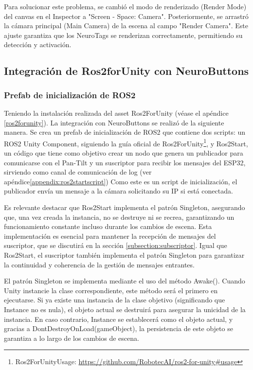 Para solucionar este problema, se cambió el modo de renderizado (Render Mode) del canvas en el Inspector a "Screen - Space: Camera". Posteriormente, se arrastró la cámara principal (Main Camera) de la escena al campo "Render Camera". Este ajuste garantiza que los NeuroTags se renderizan correctamente, permitiendo su detección y activación.

\subsection{Integración de Ros2forUnity con NeuroButtons}

\subsubsection{Prefab de inicialización de ROS2}
Teniendo la instalación realizada del asset Ros2ForUnity (véase el apéndice \ref{ros2forunity}). La integración con NeuroButtons se realizó de la siguiente manera. Se crea un prefab de inicialización de ROS2 que contiene dos scripts: un ROS2 Unity Component, siguiendo la guía oficial de Ros2ForUnity\footnote{Ros2ForUnityUsage: \url{https://github.com/RobotecAI/ros2-for-unity\#usage}}, y Ros2Start, un código que tiene como objetivo crear un nodo que genera un publicador para comunicarse con el Pan-Tilt y un suscriptor para recibir los mensajes del ESP32, sirviendo como canal de comunicación de log (ver ap\'endice\ref{appendix:ros2startscript}) Como este es un script de inicialización, el publicador envía un mensaje a la cámara solicitando su IP si está conectada.



Es relevante destacar que Ros2Start implementa el patrón Singleton, asegurando que, una vez creada la instancia, no se destruye ni se recrea, garantizando un funcionamiento constante incluso durante los cambios de escena. Esta implementación es esencial para mantener la recepción de mensajes del suscriptor, que se discutirá en la sección \ref{subsection:subscriptor}. Igual que Ros2Start, el suscriptor también implementa el patrón Singleton para garantizar la continuidad y coherencia de la gestión de mensajes entrantes.



El patrón Singleton se implementa mediante el uso del método Awake(). Cuando Unity instancie la clase correspondiente, este método será el primero en ejecutarse. Si ya existe una instancia de la clase objetivo (significando que Instance no es nula), el objeto actual se destruirá para asegurar la unicidad de la instancia. En caso contrario, Instance se establecerá como el objeto actual, y gracias a DontDestroyOnLoad(gameObject), la persistencia de este objeto se garantiza a lo largo de los cambios de escena.



